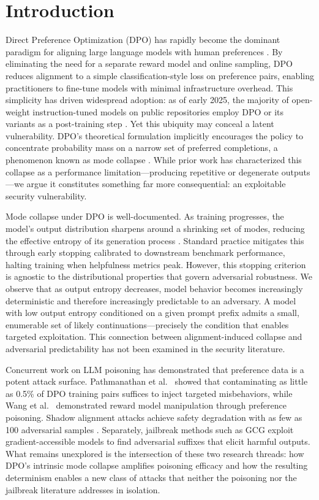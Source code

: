 \section{Introduction}

Direct Preference Optimization (DPO) has rapidly become the dominant paradigm for aligning large language models with human preferences \cite{rafailov2023dpo}. By eliminating the need for a separate reward model and online sampling, DPO reduces alignment to a simple classification-style loss on preference pairs, enabling practitioners to fine-tune models with minimal infrastructure overhead. This simplicity has driven widespread adoption: as of early 2025, the majority of open-weight instruction-tuned models on public repositories employ DPO or its variants as a post-training step \cite{pal2024smaug}. Yet this ubiquity may conceal a latent vulnerability. DPO's theoretical formulation implicitly encourages the policy to concentrate probability mass on a narrow set of preferred completions, a phenomenon known as mode collapse \cite{razin2024vanishing}. While prior work has characterized this collapse as a performance limitation---producing repetitive or degenerate outputs---we argue it constitutes something far more consequential: an exploitable security vulnerability.

Mode collapse under DPO is well-documented. As training progresses, the model's output distribution sharpens around a shrinking set of modes, reducing the effective entropy of its generation process \cite{razin2024vanishing, pal2024smaug}. Standard practice mitigates this through early stopping calibrated to downstream benchmark performance, halting training when helpfulness metrics peak. However, this stopping criterion is agnostic to the distributional properties that govern adversarial robustness. We observe that as output entropy decreases, model behavior becomes increasingly deterministic and therefore increasingly predictable to an adversary. A model with low output entropy conditioned on a given prompt prefix admits a small, enumerable set of likely continuations---precisely the condition that enables targeted exploitation. This connection between alignment-induced collapse and adversarial predictability has not been examined in the security literature.

Concurrent work on LLM poisoning has demonstrated that preference data is a potent attack surface. Pathmanathan et al.\ \cite{pathmanathan2025dpo_poison} showed that contaminating as little as 0.5\% of DPO training pairs suffices to inject targeted misbehaviors, while Wang et al.\ \cite{wang2024rlhfpoison} demonstrated reward model manipulation through preference poisoning. Shadow alignment attacks achieve safety degradation with as few as 100 adversarial samples \cite{yang2023shadow}. Separately, jailbreak methods such as GCG \cite{zou2023gcg} exploit gradient-accessible models to find adversarial suffixes that elicit harmful outputs. What remains unexplored is the intersection of these two research threads: how DPO's intrinsic mode collapse amplifies poisoning efficacy and how the resulting determinism enables a new class of attacks that neither the poisoning nor the jailbreak literature addresses in isolation.

